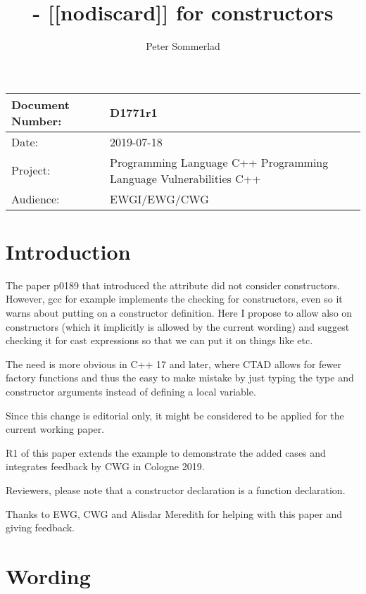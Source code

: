 \documentclass[ebook,11pt,article]{memoir}
\title{\papernumber{} - [[nodiscard]] for constructors}
\author{Peter Sommerlad}
\date{\paperdate}                %
\newcommand{\papernumber}{D1771r1}
\newcommand{\paperdate}{2019-07-18}
\begin{document}
\maketitle
\begin{center}
\begin{tabular}[t]{|l|p{8cm}|}\hline 
Document Number:&  \papernumber \\\hline
Date: & \paperdate \\\hline
Project: & Programming Language C++ \newline Programming Language Vulnerabilities C++\\\hline 
Audience: & EWGI/EWG/CWG\\\hline
\end{tabular}
\end{center}


\chapter{Introduction}

The  paper p0189 that introduced the \tcode{[[nodiscard]]} attribute did not consider constructors. However, gcc for example implements the checking for constructors, even so it warns about putting \tcode{[[nodiscard]]} on a constructor definition. Here I propose to allow  \tcode{[[nodiscard]]} also on constructors (which it implicitly is allowed by the current wording) and suggest checking it for cast expressions so that we can put it on things like  etc.

The need is more obvious in C++ 17 and later, where CTAD allows for fewer factory functions and thus the easy to make mistake by just typing the type and constructor arguments instead of defining a local variable.

Since this change is editorial only, it might be considered to be applied for the current working paper.

R1 of this paper extends the example to demonstrate the added cases and integrates feedback by CWG in Cologne 2019.

Reviewers, please note that a constructor declaration is a function declaration.

Thanks to EWG, CWG and Alisdar Meredith for helping with this paper and giving feedback.

\chapter{Wording}
\end{document}
